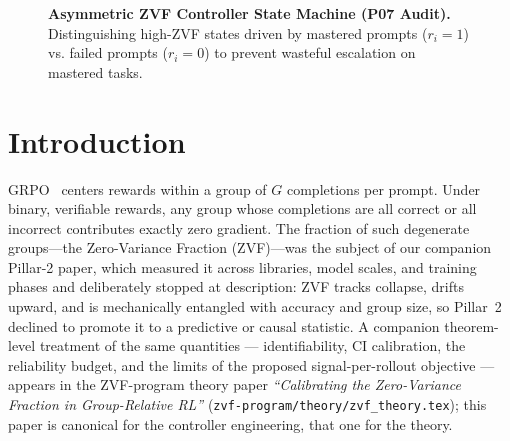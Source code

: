 \documentclass{article}
\begin{document}
\begin{figure}[htbp]
\centering
{}
\caption{\textbf{Asymmetric ZVF Controller State Machine (P07 Audit).} Distinguishing high-ZVF states driven by mastered prompts ($r_i=1$) vs. failed prompts ($r_i=0$) to prevent wasteful escalation on mastered tasks.}
\label{fig:p7_asymmetric_controller}
\end{figure}
\section{Introduction}
\label{sec:p7-intro}
GRPO~\citep{shao2024deepseekmath, guo2025deepseekr1} centers rewards within a
group of $G$ completions per prompt. Under binary, verifiable rewards, any
group whose completions are all correct or all incorrect contributes exactly
zero gradient. The fraction of such degenerate groups---the Zero-Variance
Fraction (ZVF)---was the subject of our companion Pillar-2 paper, which
measured it across libraries, model scales, and training phases and
deliberately stopped at description: ZVF tracks collapse, drifts upward, and
is mechanically entangled with accuracy and group size, so Pillar~2 declined
to promote it to a predictive or causal statistic. A companion
theorem-level treatment of the same quantities --- identifiability, CI
calibration, the reliability budget, and the limits of the proposed
signal-per-rollout objective --- appears in the ZVF-program theory paper
\emph{``Calibrating the Zero-Variance Fraction in Group-Relative RL''}
(\texttt{zvf-program/theory/zvf\_theory.tex}); this paper is canonical for
the controller engineering, that one for the theory.
\end{document}
